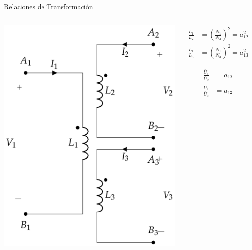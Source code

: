 \documentclass[xcolor={usenames,svgnames,dvipsnames}]{beamer}
\begin{document}
\begin{frame}[label={sec:orgf35a579}]{Relaciones de Transformación}
\begin{columns}
\begin{column}{0.6\columnwidth}
\begin{center}
\includegraphics[height=0.6\textheight]{../figs/TrafoPerfectoVariosDevanados.pdf}
\end{center}
\end{column}

\begin{column}{0.4\columnwidth}
\begin{align*}
  \frac{L_1}{L_2} &= \left(\frac{N_1}{N_2}\right)^2 = a^2_{12}\\
  \frac{L_1}{L_3} &= \left(\frac{N_1}{N_3}\right)^2 = a^2_{13}
\end{align*}

\begin{align*}
  \frac{\overline{U}_1}{\overline{U}_2} &= a_{12}\\
  \frac{\overline{U}_1}{\overline{U}_3} &= a_{13}
\end{align*}
\end{column}
\end{columns}
\end{frame}
\end{document}
